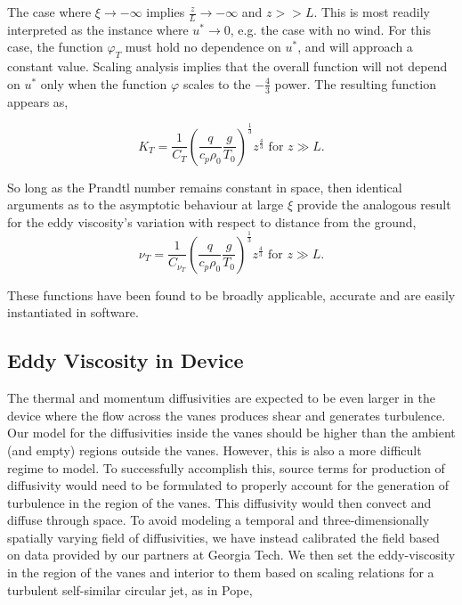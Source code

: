 The case where $\xi \to -\infty $ implies $\frac{z}{L} \to
-\infty $ and $z>>L$. This is most readily interpreted as the instance
where $u^* \to 0$, e.g. the case with no wind. For this case, the
function $\varphi_T$ must hold no dependence on $u^*$, and will approach
a constant value. Scaling analysis implies that the overall function
will not depend on $u^*$ only when the function $\varphi$ scales to the
$-\frac{4}{3}$ power. The resulting function appears as, 

\begin{equation}
 K_T = \frac{1}{C_T} \left( \frac{q}{c_p \rho_0} \frac{g}{T_0}
		     \right)^\frac{1}{3} z^{\frac{4}{3}}  \text{ 
for } z \gg L. 
\end{equation}

So long as the Prandtl number remains constant in space, then
identical arguments as to the asymptotic behaviour at large $\xi$ provide
the analogous result for the eddy viscosity's variation with respect to
distance from the ground,  
\begin{equation}
 \nu_T = \frac{1}{C_{\nu_T}} \left( \frac{q}{c_p \rho_0} \frac{g}{T_0}
			     \right)^\frac{1}{3} z^{\frac{4}{3}}  \text{ 
for } z \gg L. 
\end{equation}

These functions have been found to be broadly applicable, accurate and 
are easily instantiated in software. 

\subsection{Eddy Viscosity in Device}

The thermal and momentum diffusivities are expected to be even larger in the
device where the flow across the vanes produces shear and generates
turbulence. Our model for  
the diffusivities inside the vanes should be higher than the ambient
(and empty) regions outside the vanes. However, this is also a more
difficult regime to model. To successfully accomplish this, source terms
for production of diffusivity would need to be formulated to properly
account for the generation of turbulence in the region of the
vanes. This diffusivity would then convect and diffuse through space. 
To avoid modeling a temporal and three-dimensionally spatially
varying field of diffusivities, we have instead calibrated the field
based on data provided by our partners at Georgia Tech. 
We then set the eddy-viscosity in
the region of the vanes and interior to them based on scaling relations
for a turbulent self-similar circular jet, as in
Pope\cite{pope2000turbulent},
 
